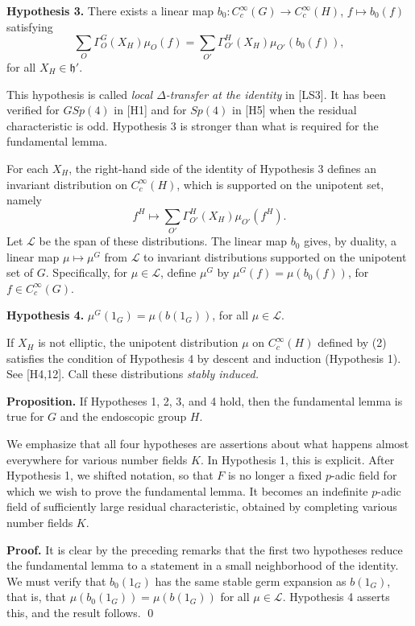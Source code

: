 \documentclass{amsart}
\newcommand\cL{{\mathcal L}}
\newcommand\h{{\mathfrak h}}
\begin{document}
{\bf Hypothesis 3.}  There exists a linear map $b_0:C_c^\infty(G) \to
C_c^\infty(H)$, $f\mapsto b_0(f)$ satisfying
$$\sum_{O} \Gamma^G_O (X_H) \mu_O(f) = \sum_{O'}\Gamma^H_{O'}(X_H)
\mu_{O'}(b_0(f)),$$
for all $X_H\in \h'$.

This hypothesis is called {\it local $\Delta$-transfer at the
  identity\/} in [LS3].  It has been verified for $GSp(4)$ in [H1] and
for $Sp(4)$ in [H5] when the residual characteristic is odd.
Hypothesis 3 is stronger than what is required for the fundamental
lemma.

For each $X_H$, the right-hand side of the identity of Hypothesis 3
defines an invariant distribution on $C_c^\infty(H)$, which is
supported on the unipotent set, namely
\begin{equation}\label{eqn:2}
f^H \mapsto \sum_{O'} \Gamma^H_{O'}(X_H)\mu_{O'}(f^H).
\end{equation}
Let $\cL$ be the span of these distributions.
The linear map $b_0$ gives, by duality, a linear map 
$\mu\mapsto\mu^G$ from $\cL$ 
to invariant distributions
supported on the unipotent set of $G$.  Specifically, for $\mu\in\cL$,
define $\mu^G$ by $\mu^G(f) = \mu(b_0(f))$, for $f\in C_c^\infty(G)$.

{\bf Hypothesis 4.}  $\mu^G(1_G) = \mu(b(1_G))$, for all $\mu \in \cL$.

If $X_H$ is not elliptic, the unipotent distribution $\mu$ on
$C^\infty_c(H)$ defined by (2) satisfies the condition of Hypothesis 4
by descent and induction (Hypothesis 1). See [H4,12].  Call these
distributions {\it stably induced.}

{\bf Proposition.}  If Hypotheses 1, 2, 3, and 4 hold, then the
fundamental lemma is true for $G$ and the endoscopic group $H$.

We emphasize that all four hypotheses are assertions
about what happens almost everywhere for various number
fields $K$.  In Hypothesis 1, this is explicit.  After
Hypothesis 1, we shifted notation, so that $F$ is no
longer a fixed $p$-adic field for which we wish to prove
the fundamental lemma.  It becomes an indefinite $p$-adic field
of sufficiently large residual characteristic, obtained
by completing various number fields $K$.

{\bf Proof.} It is clear by the preceding remarks that
the first two hypotheses reduce the fundamental lemma
to a statement in a small neighborhood of the identity.
We must verify that $b_0(1_G)$ has the same stable
germ expansion as $b(1_G)$, that is, that $\mu(b_0(1_G))=
\mu(b(1_G))$ for all $\mu\in\cL$.  Hypothesis 4 asserts
this, and the result follows. \qed
\end{document}

